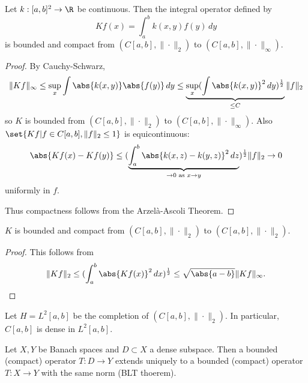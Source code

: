 \documentclass{article}
\begin{document}
\begin{lemma}
    Let $k:[a,b]^2 \to \R$ be continuous.
    Then the integral operator defined by
    \begin{equation*}
        K f(x) = \int_a^b k(x,y) f(y) \, dy
    \end{equation*}
    is bounded and compact from $(C[a,b],\|\cdot\|_2)$ to $(C[a,b],\|\cdot\|_\infty)$.
\end{lemma}

\begin{proof}
    By Cauchy-Schwarz,
    \begin{equation*}
        \|Kf\|_\infty \leq \sup_x \int \abs{k(x,y)} \abs{f(y)} \, dy \leq \underbrace{\sup_x (\int \abs{k(x,y)}^2 \, dy)^\frac{1}{2}}_{\leq C} \|f\|_2
    \end{equation*}
    so $K$ is bounded from $(C[a,b],\|\cdot\|_2)$ to $(C[a,b],\|\cdot\|_\infty)$.
    Also $\set{K f | f \in C[a,b], \|f\|_2 \leq 1}$ is equicontinuous:
    \begin{equation*}
        \abs{K f(x) - K f(y)} \leq (\underbrace{\int_a^b \abs{k(x,z) - k(y,z)}^2 \, dz}_{\to 0 \text{ as } x \to y})^\frac{1}{2} \|f\|_2 \to 0
    \end{equation*}
    uniformly in $f$.

    Thus compactness follows from the Arzel\`a-Ascoli Theorem.
\end{proof}

\begin{cor}
    $K$ is bounded and compact from $(C[a,b], \|\cdot\|_2)$ to $(C[a,b], \|\cdot\|_2)$.
\end{cor}

\begin{proof}
    This follows from
    \begin{equation*}
        \|Kf\|_2 \leq (\int_a^b \abs{K f(x)}^2 \, dx)^\frac{1}{2} \leq \sqrt{\abs{a-b}} \|K f\|_\infty. \qedhere
    \end{equation*}
\end{proof}

Let $H = L^2[a,b]$ be the completion of $(C[a,b], \|\cdot\|_2)$.
In particular, $C[a,b]$ is dense in $L^2[a,b]$.

\begin{fact}
    Let $X,Y$ be Banach spaces and $D \subset X$ a dense subspace.
    Then a bounded (compact) operator $T:D \to Y$ extends uniquely to a bounded (compact) operator $T:X \to Y$ with the same norm (BLT thoerem).
\end{fact}
\end{document}
